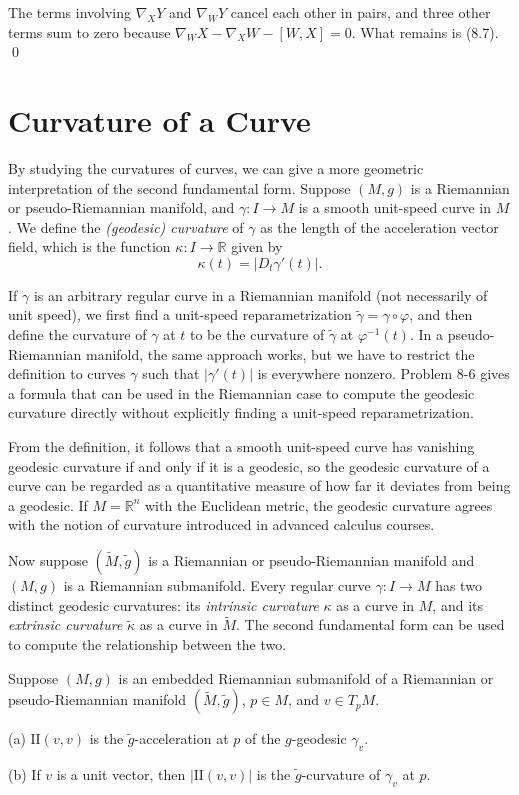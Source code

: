The terms involving $\nabla_X Y$ and $\nabla_W Y$ cancel each other in pairs, and three other terms sum to zero because $\nabla_W X - \nabla_X W - [W, X] = 0$. What remains is (8.7). \qed

\section{Curvature of a Curve}

By studying the curvatures of curves, we can give a more geometric interpretation of the second fundamental form. Suppose $(M, g)$ is a Riemannian or pseudo-Riemannian manifold, and $\gamma: I \to M$ is a smooth unit-speed curve in $M$. We define the \emph{(geodesic) curvature} of $\gamma$ as the length of the acceleration vector field, which is the function $\kappa: I \to \mathbb{R}$ given by
\[
\kappa(t) = |D_t \gamma'(t)|.
\]

If $\gamma$ is an arbitrary regular curve in a Riemannian manifold (not necessarily of unit speed), we first find a unit-speed reparametrization $\tilde{\gamma} = \gamma \circ \varphi$, and then define the curvature of $\gamma$ at $t$ to be the curvature of $\tilde{\gamma}$ at $\varphi^{-1}(t)$. In a pseudo-Riemannian manifold, the same approach works, but we have to restrict the definition to curves $\gamma$ such that $|\gamma'(t)|$ is everywhere nonzero. Problem 8-6 gives a formula that can be used in the Riemannian case to compute the geodesic curvature directly without explicitly finding a unit-speed reparametrization.

From the definition, it follows that a smooth unit-speed curve has vanishing geodesic curvature if and only if it is a geodesic, so the geodesic curvature of a curve can be regarded as a quantitative measure of how far it deviates from being a geodesic. If $M = \mathbb{R}^n$ with the Euclidean metric, the geodesic curvature agrees with the notion of curvature introduced in advanced calculus courses.

Now suppose $(\tilde{M}, \tilde{g})$ is a Riemannian or pseudo-Riemannian manifold and $(M, g)$ is a Riemannian submanifold. Every regular curve $\gamma: I \to M$ has two distinct geodesic curvatures: its \emph{intrinsic curvature} $\kappa$ as a curve in $M$, and its \emph{extrinsic curvature} $\tilde{\kappa}$ as a curve in $\tilde{M}$. The second fundamental form can be used to compute the relationship between the two.

\begin{proposition}
\label{prop:geometric-interpretation-ii}
Suppose $(M, g)$ is an embedded Riemannian submanifold of a Riemannian or pseudo-Riemannian manifold $(\tilde{M}, \tilde{g})$, $p \in M$, and $v \in T_p M$.

(a) $\text{II}(v, v)$ is the $\tilde{g}$-acceleration at $p$ of the $g$-geodesic $\gamma_v$.

(b) If $v$ is a unit vector, then $|\text{II}(v, v)|$ is the $\tilde{g}$-curvature of $\gamma_v$ at $p$.
\end{proposition}


